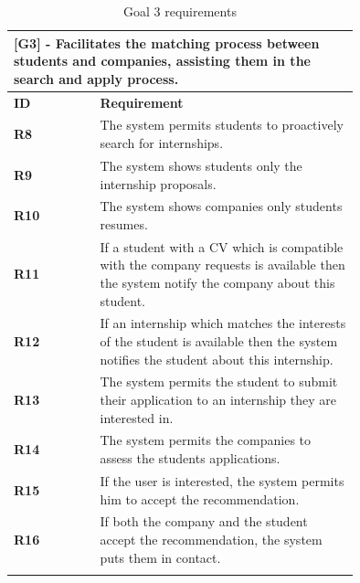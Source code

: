 \documentclass[12pt]{article}
\numberwithin{figure}{section}
\numberwithin{table}{section}
\begin{document}
    \begin{center}
        \begin{longtable}{|l|p{0.75\linewidth}|}
            \hline
            \multicolumn{2}{|p{0.75\linewidth}|}{\textbf{[G3] - Facilitates the matching process between students and companies, assisting them in the search and apply process.}} \\
            \hline
            \textbf{ID} & \textbf{Requirement}  \\
            \hline
            \textbf{R8} & The system permits students to proactively search for internships. \\
            \hline
            \textbf{R9} & The system shows students only the internship proposals. \\
            \hline
            \textbf{R10} & The system shows companies only students resumes. \\
            \hline
            \textbf{R11} & If a student with a CV which is compatible with the company requests is available then the system notify the company about this student. \\
            \hline
            \textbf{R12} & If an internship which matches the interests of the student is available then the system notifies the student about this internship. \\
            \hline
            \textbf{R13} & The system permits the student to submit their application to an internship they are interested in. \\
            \hline
            \textbf{R14} & The system permits the companies to assess the students applications. \\
            \hline
            \textbf{R15} & If the user is interested, the system permits him to accept the recommendation. \\
            \hline
            \textbf{R16} & If both the company and the student accept the recommendation, the system puts them in contact. \\
            \hline
            \caption{Goal 3 requirements}
        \end{longtable}
    \end{center}
\end{document}
